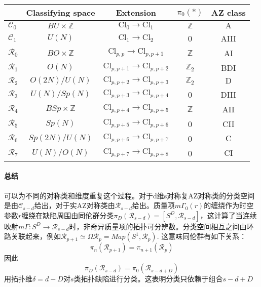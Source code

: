 \documentclass[a4paper]{article}
\numberwithin{equation}{subsection}
\begin{document}
\begin{table}[h]
    \centering
    \begin{tabular}{lcccc}
        \hline \hline & Classifying space & Extension & $\pi_{0}(*)$ & AZ class \\
        \hline $\mathcal{C}_{0}$ & $B U \times \mathbb{Z}$ & $\mathrm{Cl}_{0} \rightarrow \mathrm{Cl}_{1}$ & $\mathbb{Z}$ & $\mathrm{A}$ \\
        $\mathcal{C}_{1}$ & $U(N)$ & $\mathrm{Cl}_{1} \rightarrow \mathrm{Cl}_{2}$ & 0 & AIII \\
        $\mathcal{R}_{0}$ & $B O \times \mathbb{Z}$ & $\mathrm{Cl}_{p, p} \rightarrow \mathrm{Cl}_{p, p+1}$ & $\mathbb{Z}$ & AI \\
        $\mathcal{R}_{1}$ & $O(N)$ & $\mathrm{Cl}_{p, p+1} \rightarrow \mathrm{Cl}_{p, p+2}$ & $\mathbb{Z}_{2}$ & BDI \\
        $\mathcal{R}_{2}$ & $O(2 N) / U(N)$ & $\mathrm{Cl}_{p, p+2} \rightarrow \mathrm{Cl}_{p, p+3}$ & $\mathbb{Z}_{2}$ & $\mathrm{D}$ \\
        $\mathcal{R}_{3}$ & $U(N) / S p(N)$ & $\mathrm{Cl}_{p, p+3} \rightarrow \mathrm{Cl}_{p, p+4}$ & 0 & DIII \\
        $\mathcal{R}_{4}$ & $B S p \times \mathbb{Z}$ & $\mathrm{Cl}_{p, p+4} \rightarrow \mathrm{Cl}_{p, p+5}$ & $\mathbb{Z}$ & AII \\
        $\mathcal{R}_{5}$ & $S p(N)$ & $\mathrm{Cl}_{p, p+5} \rightarrow \mathrm{Cl}_{p, p+6}$ & 0 & CII \\
        $\mathcal{R}_{6}$ & $S p(2 N) / U(N)$ & $\mathrm{Cl}_{p, p+6} \rightarrow \mathrm{Cl}_{p, p+7}$ & 0 & $\mathrm{C}$ \\
        $\mathcal{R}_{7}$ & $U(N) / O(N)$ & $\mathrm{Cl}_{p, p+7} \rightarrow \mathrm{Cl}_{p, p+8}$ & 0 & $\mathrm{CI}$ \\
        \hline \hline
    \end{tabular}
\end{table}
\paragraph{总结}
可以为不同的对称类和维度重复这个过程。对于d维s对称复AZ对称类的分类空间是由$\mathcal{C}_{s-d}$给出，对于实AZ对称类由$\mathcal{R}_{s-d}$给出。质量项$m\Gamma_0(r)$的缠绕作为时空参数$r$缠绕在缺陷周围由同伦群分类$\pi_D(\mathcal{R}_{s-d})=[S^D,\mathcal{R}_{s-d}]$，这计算了当连续映射$m\Gamma:S^D\rightarrow \mathcal{R}_{s-d}$时，非奇异质量项的拓扑可分辨数。分类空间相互之间由环路关联起来，例如$\mathcal{R}_{p+1}\simeq\Omega\mathcal{R}_{p}=Map(S^1,\mathcal{R}_p)$. 这意味同伦群有如下关系：
\begin{equation}
    \pi_n(\mathcal{R}_{p+1})=\pi_{n+1}(\mathcal{R}_p)
\end{equation}
因此
\begin{equation}
    \pi_D(\mathcal{R}_{s-d})=\pi_0(\mathcal{R}_{s-d+D})
\end{equation}
用拓扑维$\delta=d-D$对$s$类拓扑缺陷进行分类。这表明分类只依赖于组合$s-d+D$
\end{document}
